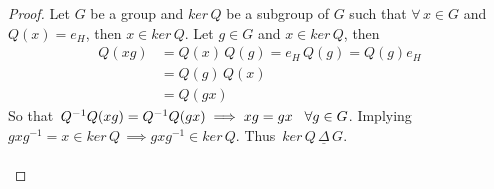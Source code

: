 \documentclass[11pt,a4paper]{article}
\theoremstyle{definition}
\begin{document}
\begin{proof}
Let $G$ be a group and $ker \, Q$ be a subgroup of $G$ such that $\forall\, x\in G$ and $Q(x) = e_H$, then $x\in ker\, Q$. Let $g\in G$ and $x\in ker\, Q$, then 
\begin{align*}
Q(xg) & = Q(x)\, Q(g) = e_H\,Q(g) = Q(g) e_H\\
& = Q(g)\, Q(x)\\
& = Q(gx)
\end{align*}
So that $\, Q^{-1}Q(xg) = Q^{-1}Q(gx) \implies xg = gx \hspace{0.3cm} \forall g\in G$. Implying $gxg^{-1} = x\in ker\, Q\, \implies gxg^{-1}\in ker\, Q$. Thus $\, ker\, Q\, \underline{\Delta}\, G$.\\\\





\pagebreak
\end{proof}
\end{document}
